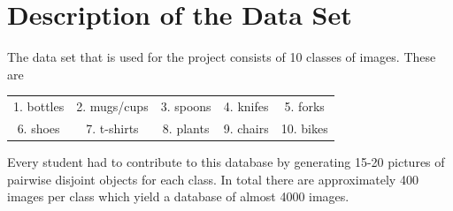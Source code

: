 \documentclass{tubaf-article}
\begin{document}
	\section{Description of the Data Set}
	\label{dataset}
	The data set that is used for the project consists of 10 classes of images. These are
	\begin{center}
		\begin{tabular}{ c c c c c }
			1. bottles & 2. mugs/cups & 3. spoons & 4. knifes & 5. forks \\ 
			6. shoes & 7. t-shirts & 8. plants & 9. chairs & 10. bikes    
		\end{tabular}
	\end{center}
	Every student had to contribute to this database by generating 15-20 pictures of pairwise disjoint objects for each class. In total there are approximately 400 images per class which yield a database of almost 4000 images. 
\end{document}
